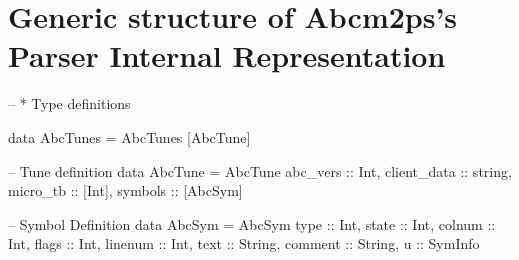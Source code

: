 \documentclass[main.tex]{subfiles}
\begin{document}
\appendix
\chapter{Generic structure of Abcm2ps's Parser Internal Representation}
\label{sec:generic_structure_of_abcm2ps_parser_internal_representation}

% 
% 

\begin{code}

-- * Type definitions

data AbcTunes =  AbcTunes [AbcTune]  


--  Tune definition
data AbcTune =  AbcTune {  
                  abc_vers :: Int,              
                  client_data :: string,        
                  micro_tb :: [Int],            
                  symbols :: [AbcSym]           
                }


--  Symbol Definition
data AbcSym =   AbcSym {
                  type :: Int,                  
                  state :: Int,                 
                  colnum :: Int,                
                  flags :: Int,                 
                  linenum :: Int,               
                  text :: String,               
                  comment :: String,            
                  u :: SymInfo                  
                }



\end{code}
\end{document}
